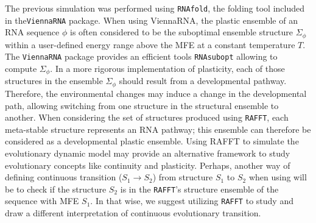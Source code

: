
The previous simulation was performed using \texttt{RNAfold}, the folding tool included in the\texttt{ViennaRNA} package. When using ViennaRNA, the plastic ensemble of an RNA sequence $\phi$ is often considered to be the suboptimal ensemble structure $\Sigma_{\phi}$ within a user-defined energy range above the MFE  at a constant temperature $T$. The \texttt{ViennaRNA} package provides an efficient tools \texttt{RNAsubopt} allowing to compute $\Sigma_{\phi}$.  In a more rigorous implementation of plasticity, each of those structures in the ensemble $\Sigma_{\phi}$ should result from a developmental pathway. Therefore, the environmental changes may induce a change in the developmental path, allowing switching from one structure in the structural ensemble to another. When considering the set of structures produced using \texttt{RAFFT}, each meta-stable structure represents an RNA pathway; this ensemble can therefore be considered as a developmental plastic ensemble. Using RAFFT to simulate the evolutionary dynamic model may provide an alternative framework to study evolutionary concepts like continuity and plasticity. Perhaps, another way of defining continuous transition ($S_1\rightarrow S_2$) from structure $S_1$ to $S_2$ when using will be to check if the structure $S_2$ is in the \texttt{RAFFT}'s structure ensemble of the sequence with MFE $S_1$. In that wise, we suggest utilizing \texttt{RAFFT} to study and draw a different interpretation of continuous evolutionary transition.



